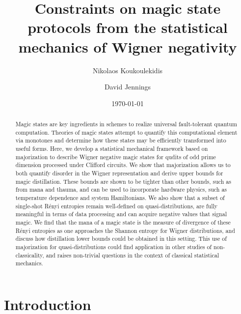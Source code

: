 \documentclass[
onecolumn,
superscriptaddress
]{revtex4-1}
\begin{document}
\begin{abstract}
Magic states are key ingredients in schemes to realize universal fault-tolerant quantum computation.
Theories of magic states attempt to quantify this computational element via monotones and determine how these states may be efficiently transformed into useful forms. Here, we develop a statistical mechanical framework based on majorization to describe Wigner negative magic states for qudits of odd prime dimension processed under Clifford circuits. We show that majorization allows us to both quantify disorder in the Wigner representation and derive upper bounds for magic distillation. These bounds are shown to be tighter than other bounds, such as from mana and thauma, and can be used to incorporate hardware physics, such as temperature dependence and system Hamiltonians. We also show that a subset of single-shot R\'{e}nyi entropies remain well-defined on quasi-distributions, are fully meaningful in terms of data processing and can acquire negative values that signal magic. We find that the mana of a magic state is the measure of divergence of these R\'{e}nyi entropies as one approaches the Shannon entropy for Wigner distributions, and discuss how distillation lower bounds could be obtained in this setting.  This use of majorization for quasi-distributions could find application in other studies of non-classicality, and raises non-trivial questions in the context of classical statistical mechanics.
\end{abstract}


\title{Constraints on magic state protocols from the statistical mechanics of Wigner negativity}

\author{Nikolaos Koukoulekidis}
\author{David Jennings}

\date{\today}
\maketitle

\section*{Introduction}
\end{document}
